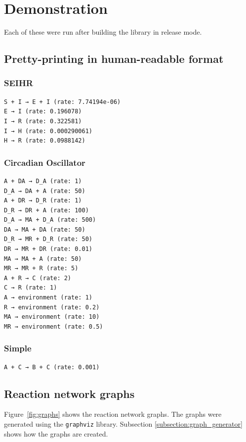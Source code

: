 \section{Demonstration}
Each of these were run after building the library in release mode.

\subsection{Pretty-printing in human-readable format}
\subsubsection{SEIHR}
\begin{verbatim}
S + I → E + I (rate: 7.74194e-06)
E → I (rate: 0.196078)
I → R (rate: 0.322581)
I → H (rate: 0.000290061)
H → R (rate: 0.0988142)
\end{verbatim}

\subsubsection{Circadian Oscillator}
\begin{verbatim}
A + DA → D_A (rate: 1)
D_A → DA + A (rate: 50)
A + DR → D_R (rate: 1)
D_R → DR + A (rate: 100)
D_A → MA + D_A (rate: 500)
DA → MA + DA (rate: 50)
D_R → MR + D_R (rate: 50)
DR → MR + DR (rate: 0.01)
MA → MA + A (rate: 50)
MR → MR + R (rate: 5)
A + R → C (rate: 2)
C → R (rate: 1)
A → environment (rate: 1)
R → environment (rate: 0.2)
MA → environment (rate: 10)
MR → environment (rate: 0.5)
\end{verbatim}

\subsubsection{Simple}
\begin{verbatim}
A + C → B + C (rate: 0.001)
\end{verbatim}

\subsection{Reaction network graphs}
Figure~\ref{fig:graphs} shows the reaction network graphs.
The graphs were generated using the \texttt{graphviz} library.
Subsection \ref{subsection:graph_generator} shows how the graphs are created.

